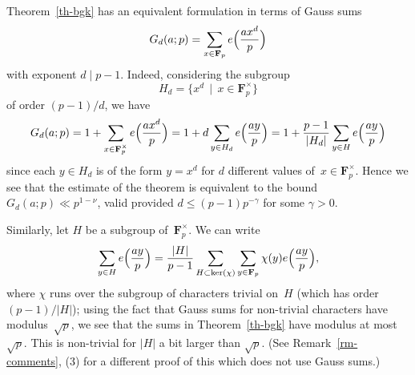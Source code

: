 \documentclass[12pt]{amsart}
\renewcommand{\leq}{\leqslant}
\numberwithin{equation}{section}
\newcommand{\Ff}{\mathbf{F}}
\theoremstyle{plain}
\theoremstyle{remark}
\theoremstyle{definition}
\renewcommand{\leq}{\leqslant}
\begin{document}
Theorem~\ref{th-bgk} has an equivalent formulation in terms of Gauss
sums
$$
G_d(a;p)=\sum_{x\in\Ff_p}e\Bigl(\frac{ax^d}{p}\Bigr)
$$
with exponent $d\mid p-1$. Indeed, considering the subgroup
$$
H_d=\{x^d\,\mid\, x\in\Ff_p^{\times}\}
$$
of order $(p-1)/d$, we have
$$
G_d(a;p)= 1+ \sum_{x\in\Ff_p^{\times}}e\Bigl(\frac{ax^d}{p}\Bigr)
=1+d\sum_{y\in H_d}e\Bigl(\frac{ay}{p}\Bigr)=
1+\frac{p-1}{|H_d|}\sum_{y\in H}e\Bigl(\frac{ay}{p}\Bigr)
$$
since each $y\in H_d$ is of the form $y=x^d$ for $d$ different values
of~$x\in\Ff_p^{\times}$. Hence we see that the estimate of the theorem
is equivalent to the bound $G_d(a;p)\ll p^{1-\nu}$, valid provided
$d\leq (p-1)p^{-\gamma}$ for some $\gamma>0$.

Similarly, let $H$ be a subgroup of~$\Ff_p^{\times}$. We can write
$$
\sum_{y\in H}e\Bigl(\frac{ay}{p}\Bigr) =\frac{|H|}{p-1}\sum_{H\subset
  \ker(\chi)}\sum_{y\in\Ff_p}\chi(y)e\Bigl(\frac{ay}{p}\Bigr),
$$
where $\chi$ runs over the subgroup of characters trivial on~$H$ (which
has order $(p-1)/|H|$); using the fact that Gauss sums for non-trivial
characters have modulus~$\sqrt{p}$, we see that the sums in
Theorem~\ref{th-bgk} have modulus at most $\sqrt{p}$. This is
non-trivial for $|H|$ a bit larger than $\sqrt{p}$. (See
Remark~\ref{rm-comments}, (3) for a different proof of this which does
not use Gauss sums.)
\end{document}
